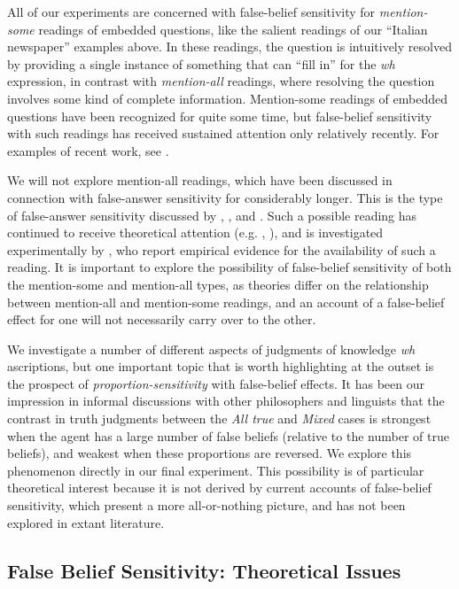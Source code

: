 \documentclass[a4paper]{article}
\begin{document}
All of our experiments are concerned with false-belief sensitivity for \emph{mention-some} readings of embedded questions, like the salient readings of our ``Italian newspaper'' examples above. In these readings, the question is intuitively resolved by providing a single instance of something that can ``fill in'' for the \textit{wh} expression, in contrast with \emph{mention-all} readings, where resolving the question involves some kind of complete information. Mention-some readings of embedded questions have been recognized for quite some time, but false-belief sensitivity with such readings has received sustained attention only relatively recently. For examples of recent work, see \citep{george:dis,cremerschemla:2014,theiler:etal,xiang:sub:16}.

We will not explore mention-all readings, which have been discussed in connection with false-answer sensitivity for considerably longer. This is the type of false-answer sensitivity discussed by \citet{gs:82}, \citet{berman}, and \citet{spector:05}. Such a possible reading has continued to receive theoretical attention (e.g. \citet{theiler:etal} \citet{xiang:sub:16}, \citet{cremers:plurality}), and is investigated experimentally by \citet{cremerschemla:2014}, who report empirical evidence for the availability of such a  reading. It is important to explore the possibility of false-belief sensitivity of both the mention-some and mention-all types, as theories differ on the relationship between mention-all and mention-some readings, and an account of a false-belief effect for one will not necessarily carry over to the other.

We investigate a number of different aspects of judgments of knowledge \textit{wh} ascriptions, but one important topic that is worth highlighting at the outset is the prospect of \emph{proportion-sensitivity} with false-belief effects. It has been our impression in informal discussions with other philosophers and linguists that the contrast in truth judgments between the \textit{All true} and \textit{Mixed} cases is strongest when the agent has a large number of false beliefs (relative to the number of true beliefs), and weakest when these proportions are reversed. We explore this phenomenon directly in our final experiment. This possibility is of particular theoretical interest because it is not derived by current accounts of false-belief sensitivity, which present a more all-or-nothing picture, and has not been explored in extant literature.

\subsection{False Belief Sensitivity: Theoretical Issues}
\end{document}
